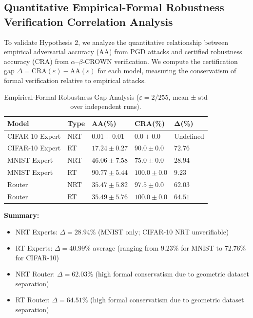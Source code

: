 \documentclass[11pt,a4paper]{article}
\begin{document}
\subsection{Quantitative Empirical-Formal Robustness Verification Correlation Analysis}

To validate Hypothesis 2, we analyze the quantitative relationship between empirical adversarial accuracy (AA) from PGD attacks and certified robustness accuracy (CRA) from $\alpha$--$\beta$-CROWN verification. We compute the certification gap $\Delta = \text{CRA}(\varepsilon) - \text{AA}(\varepsilon)$ for each model, measuring the conservatism of formal verification relative to empirical attacks.

\begin{table}[H]
\centering
\begin{tabular}{lllll}
\toprule
\textbf{Model} & \textbf{Type} & \textbf{AA(\%)} & \textbf{CRA(\%)} & $\boldsymbol{\Delta}$\textbf{(\%)} \\
\midrule
CIFAR-10 Expert & NRT & $0.01 \pm 0.01$ & $0.0 \pm 0.0$ & Undefined \\
CIFAR-10 Expert & RT & $17.24 \pm 0.27$ & $90.0 \pm 0.0$ & $72.76$ \\
MNIST Expert & NRT & $46.06 \pm 7.58$ & $75.0 \pm 0.0$ & $28.94$ \\
MNIST Expert & RT & $90.77 \pm 5.44$ & $100.0 \pm 0.0$ & $9.23$ \\
Router & NRT & $35.47 \pm 5.82$ & $97.5 \pm 0.0$ & $62.03$ \\
Router & RT & $35.49 \pm 5.76$ & $100.0 \pm 0.0$ & $64.51$ \\
\bottomrule
\end{tabular}
\caption{Empirical-Formal Robustness Gap Analysis ($\varepsilon = 2/255$, mean ± std over independent runs).}
\end{table}

\textbf{Summary:}
\begin{itemize}
    \item NRT Experts: $\Delta = 28.94\%$ (MNIST only; CIFAR-10 NRT unverifiable)
    \item RT Experts: $\Delta = 40.99\%$ average (ranging from 9.23\% for MNIST to 72.76\% for CIFAR-10)
    \item NRT Router: $\Delta = 62.03\%$ (high formal conservatism due to geometric dataset separation)
    \item RT Router: $\Delta = 64.51\%$ (high formal conservatism due to geometric dataset separation)
\end{itemize}
\end{document}
